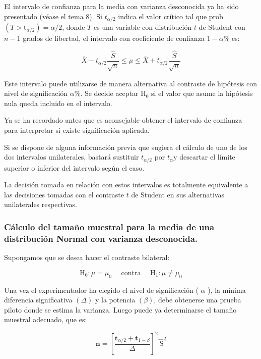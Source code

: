 \documentclass[
]{article}
\begin{document}
El intervalo de confianza para la media con varianza desconocida ya ha sido presentado (véase el tema 8). Si \(t_{\alpha / 2}\) indica el valor crítico tal que prob \(\left(T>\mathrm{t}_{\alpha / 2}\right)=\alpha / 2\), donde \(T\) es una variable con distribución \(t\) de Student con \(n-1\) grados de libertad, el intervalo con coeficiente de confianza \(1-\alpha \%\) es:

\[
\bar{X}-t_{\alpha / 2} \frac{\hat{S}}{\sqrt{n}} \leq \mu \leq \bar{X}+t_{\alpha / 2} \frac{\hat{S}}{\sqrt{n}}
\]

Este intervalo puede utilizarse de manera alternativa al contraste de hipótesis con nivel de significación \(\alpha \%\). Se decide aceptar \(\mathrm{H}_{0}\) si el valor que asume la hipótesis nula queda incluido en el intervalo.

Ya se ha recordado antes que es aconsejable obtener el intervalo de confianza para interpretar si existe significación aplicada.

Si se dispone de alguna información previa que sugiera el cálculo de uno de los dos intervalos unilaterales, bastará sustituir \(t_{\alpha / 2}\) por \(t_{\alpha} \mathrm{y}\) descartar el límite superior o inferior del intervalo según el caso.

La decisión tomada en relación con estos intervalos es totalmente equivalente a las decisiones tomadas con el contraste \(t\) de Student en sus alternativas unilaterales respectivas.

\subsubsection{Cálculo del tamaño muestral para la media de una distribución Normal con varianza desconocida.}\label{cuxe1lculo-del-tamauxf1o-muestral-para-la-media-de-una-distribuciuxf3n-normal-con-varianza-desconocida.}

Supongamos que se desea hacer el contraste bilateral:

\[
\mathrm{H}_{0}: \mu=\mu_{0} \quad \text { contra } \quad \mathrm{H}_{1}: \mu \neq \mu_{0}
\]

Una vez el experimentador ha elegido el nivel de significación ( \(\alpha\) ), la mínima diferencia significativa \((\Delta)\) y la potencia \((\beta)\), debe obtenerse una prueba piloto donde se estima la varianza. Luego puede ya determinarse el tamaño muestral adecuado, que es:

\[
\mathbf{n}=\left[\frac{\mathbf{t}_{\alpha / 2}+\mathbf{t}_{1-\beta}}{\Delta}\right]^{2} \hat{\mathrm{~S}}^{2}
\]
\end{document}
